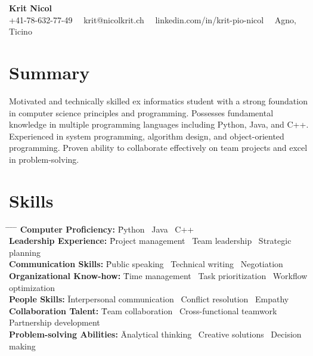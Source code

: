 \documentclass[a4paper,11pt]{article}  %
\begin{document}
\begin{center}
    {\fontsize{18pt}{22pt}\selectfont \textbf{Krit Nicol}} \\
    \vspace{0.2in}
    +41-78-632-77-49 \, \textbullet \, krit@nicolkrit.ch \, \textbullet \, linkedin.com/in/krit-pio-nicol \, \textbullet \, Agno, Ticino \\
\end{center}

\vspace{0.2in}

\section*{Summary}
Motivated and technically skilled ex informatics student with a strong foundation in computer science principles and programming. 
Possesses fundamental knowledge in multiple programming languages including Python, Java, and C++. 
Experienced in system programming, algorithm design, and object-oriented programming. 
Proven ability to collaborate effectively on team projects and excel in problem-solving. 
\vspace{0.2in}

\section*{Skills}
\begin{tabbing}
    \hspace{1in} \= \hspace{1in} \= \hspace{1in} \= \hspace{1in} \= \kill
    \textbf{Computer Proficiency:} \= Python \textbullet \, Java \textbullet \, C++ \\
    \textbf{Leadership Experience:} \= Project management \textbullet \, Team leadership \textbullet \, Strategic planning \\
    \textbf{Communication Skills:} \= Public speaking \textbullet \, Technical writing \textbullet \, Negotiation \\
    \textbf{Organizational Know-how:} \= Time management \textbullet \, Task prioritization \textbullet \, Workflow optimization \\
    \textbf{People Skills:} \= Interpersonal communication \textbullet \, Conflict resolution \textbullet \, Empathy \\
    \textbf{Collaboration Talent:} \= Team collaboration \textbullet \, Cross-functional teamwork \textbullet \, Partnership development \\
    \textbf{Problem-solving Abilities:} \= Analytical thinking \textbullet \, Creative solutions \textbullet \, Decision making \\
\end{tabbing}
\end{document}
